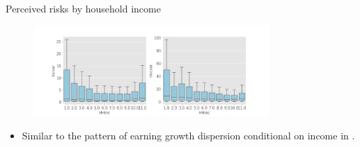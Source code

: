\documentclass{beamer}
\begin{document}


\begin{frame}{Perceived risks by household income}
\begin{figure}
	\centering
	\label{boxplot_hhinc}
	\includegraphics[width=0.8\textwidth]{figures/boxplot_var_HHinc}
\end{figure}
	\begin{itemize}
	\item Similar to the pattern of earning growth dispersion conditional on income in \cite{bloom2018great}. 
\end{itemize}
\end{frame}
\end{document}
